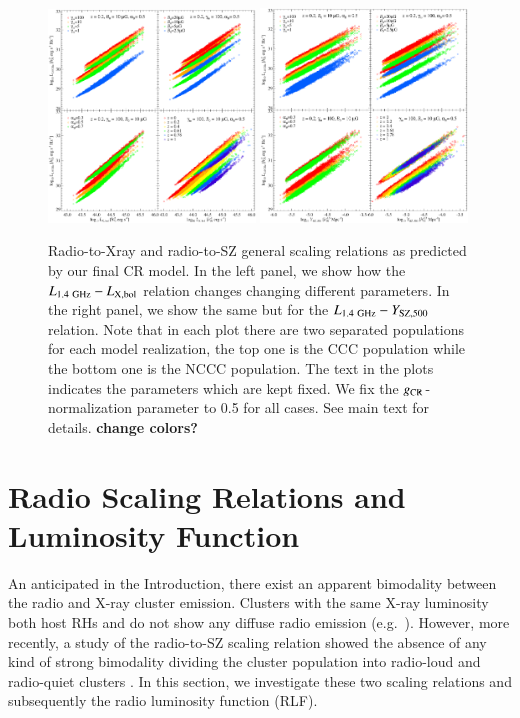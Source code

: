 \documentclass[traditabstract]{aa}
\newcommand{\rmn}{\mathrm}
\begin{document}
\begin{figure}[hbt!]
\centering
\includegraphics[width=0.49\textwidth]{figures/PL_relation_testing_gimp.eps}
\includegraphics[width=0.49\textwidth]{figures/PSZ_relation_testing_gimp.eps}
\caption{Radio-to-Xray and radio-to-SZ general scaling relations as predicted by our final CR model. In the left panel, we show how the $L_{1.4~\rmn{GHz}}-L_{\rm{X,bol}}$ relation changes changing different parameters. In the right panel, we show the same but for the $L_{1.4~\rmn{GHz}}-Y_{\rm{SZ},500}$ relation. Note that in each plot there are two separated populations for each model realization, the top one is the CCC population while the bottom one is the NCCC population. The text in the plots indicates the parameters which are kept fixed. We fix the $g_{\rm{CR}}$-normalization parameter to 0.5 for all cases. See main text for details. {\bf change colors?}}
\label{fig:SR}
\end{figure}

\section{Radio Scaling Relations and Luminosity Function}
\label{sec:4}
An anticipated in the Introduction, there exist an apparent bimodality between the radio and X-ray cluster emission. Clusters with the same X-ray luminosity both host RHs and do not show any diffuse radio emission (e.g.~\citealp{2009A&A...507..661B,2011A&A...527A..99E}). However, more recently, a study of the radio-to-SZ scaling relation showed the absence of any kind of strong bimodality dividing the cluster population into radio-loud and radio-quiet clusters \citep{2012MNRAS.421L.112B}. In this section, we investigate these two scaling relations and subsequently the radio luminosity function (RLF).
\end{document}
